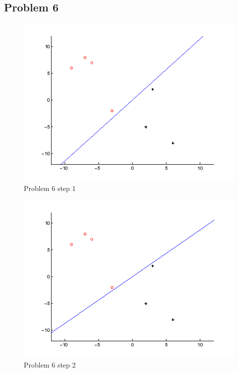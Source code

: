\newpage
\subsection*{Problem 6}
\begin{figure}
\centering{}\includegraphics[width=1\textwidth]{plots/6_1}\caption{Problem 6 step 1}
\end{figure}
\begin{figure}
\centering{}\includegraphics[width=1\textwidth]{plots/6_2}\caption{Problem 6 step 2}
\end{figure}
